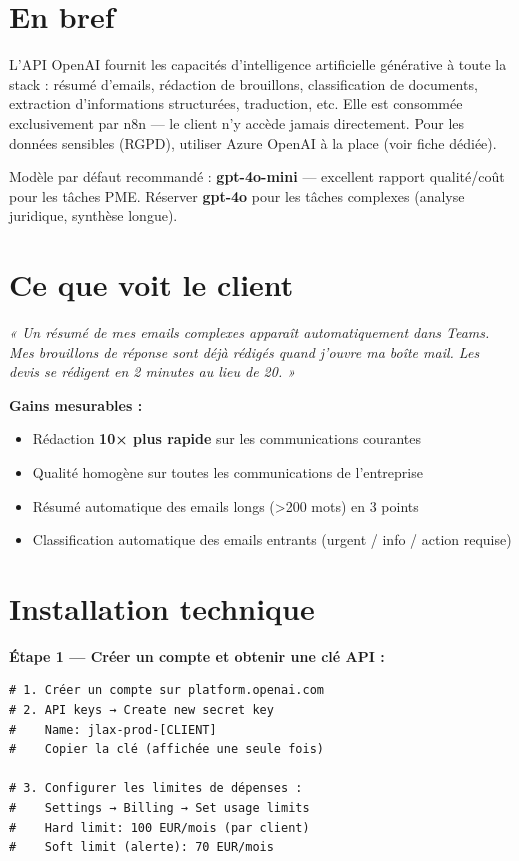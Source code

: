 \documentclass[11pt, a4paper]{article}
\begin{document}
\ficheHeader

\section*{En bref}
L'API OpenAI fournit les capacités d'intelligence artificielle générative à toute la stack : résumé d'emails, rédaction de brouillons, classification de documents, extraction d'informations structurées, traduction, etc. Elle est consommée exclusivement par n8n — le client n'y accède jamais directement. Pour les données sensibles (RGPD), utiliser Azure OpenAI à la place (voir fiche dédiée).

\begin{pointcle}
  Modèle par défaut recommandé : \textbf{gpt-4o-mini} — excellent rapport qualité/coût pour les tâches PME. Réserver \textbf{gpt-4o} pour les tâches complexes (analyse juridique, synthèse longue).
\end{pointcle}

\section{Ce que voit le client}

\begin{clientbox}
  \textit{« Un résumé de mes emails complexes apparaît automatiquement dans Teams. Mes brouillons de réponse sont déjà rédigés quand j'ouvre ma boîte mail. Les devis se rédigent en 2 minutes au lieu de 20. »}
\end{clientbox}

\textbf{Gains mesurables :}
\begin{itemize}
  \item Rédaction \textbf{10× plus rapide} sur les communications courantes
  \item Qualité homogène sur toutes les communications de l'entreprise
  \item Résumé automatique des emails longs (>200 mots) en 3 points
  \item Classification automatique des emails entrants (urgent / info / action requise)
\end{itemize}

\section{Installation technique}

\textbf{Étape 1 — Créer un compte et obtenir une clé API :}
\begin{lstlisting}[style=terminal]
# 1. Créer un compte sur platform.openai.com
# 2. API keys → Create new secret key
#    Name: jlax-prod-[CLIENT]
#    Copier la clé (affichée une seule fois)

# 3. Configurer les limites de dépenses :
#    Settings → Billing → Set usage limits
#    Hard limit: 100 EUR/mois (par client)
#    Soft limit (alerte): 70 EUR/mois
\end{lstlisting}
\end{document}
